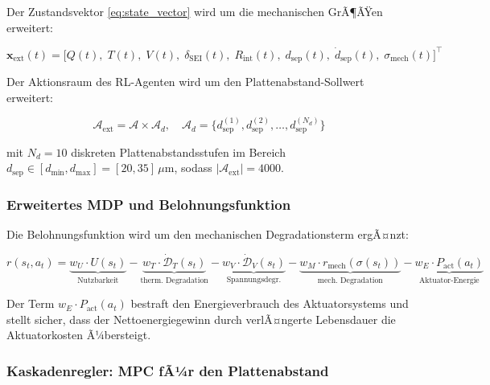﻿\documentclass[12pt,a4paper]{article}
\begin{document}
Der Zustandsvektor \eqref{eq:state_vector} wird um die mechanischen GrÃ¶ÃŸen
erweitert:

\begin{equation}
	\mathbf{x}_\mathrm{ext}(t) = \bigl[Q(t),\; T(t),\; V(t),\; \delta_\mathrm{SEI}(t),\;
	R_\mathrm{int}(t),\; d_\mathrm{sep}(t),\; \dot{d}_\mathrm{sep}(t),\;
	\sigma_\mathrm{mech}(t)\bigr]^\top
	\label{eq:state_vector_ext}
\end{equation}

Der Aktionsraum des RL-Agenten wird um den Plattenabstand-Sollwert erweitert:

\begin{equation}
	\mathcal{A}_\mathrm{ext} = \mathcal{A} \times \mathcal{A}_d, \quad
	\mathcal{A}_d = \{d_\mathrm{sep}^{(1)}, d_\mathrm{sep}^{(2)}, \ldots, d_\mathrm{sep}^{(N_d)}\}
	\label{eq:action_space_ext}
\end{equation}

mit $N_d = 10$ diskreten Plattenabstandsstufen im Bereich
$d_\mathrm{sep} \in [d_\mathrm{min}, d_\mathrm{max}] = [20, 35]\,\mu\mathrm{m}$,
sodass $|\mathcal{A}_\mathrm{ext}| = 4000$.

\subsubsection{Erweitertes MDP und Belohnungsfunktion}

Die Belohnungsfunktion wird um den mechanischen Degradationsterm ergÃ¤nzt:

\begin{equation}
	r(s_t, a_t) = \underbrace{w_U \cdot U(s_t)}_{\text{Nutzbarkeit}}
	- \underbrace{w_T \cdot \dot{\mathcal{D}}_T(s_t)}_{\text{therm.\ Degradation}}
	- \underbrace{w_V \cdot \dot{\mathcal{D}}_V(s_t)}_{\text{Spannungsdegr.}}
	- \underbrace{w_M \cdot r_\mathrm{mech}(\sigma(s_t))}_{\text{mech.\ Degradation}}
	- \underbrace{w_E \cdot P_\mathrm{act}(a_t)}_{\text{Aktuator-Energie}}
	\label{eq:reward_extended}
\end{equation}

Der Term $w_E \cdot P_\mathrm{act}(a_t)$ bestraft den Energieverbrauch des
Aktuatorsystems und stellt sicher, dass der Nettoenergiegewinn durch verlÃ¤ngerte
Lebensdauer die Aktuatorkosten Ã¼bersteigt.

\subsubsection{Kaskadenregler: MPC fÃ¼r den Plattenabstand}
\end{document}
